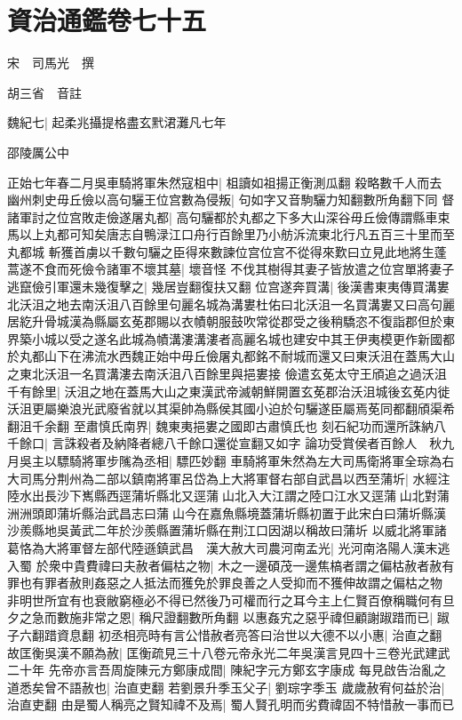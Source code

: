\chapter{資治通鑑卷七十五}
宋　司馬光　撰

胡三省　音註

魏紀七|{
	起柔兆攝提格盡玄黓涒灘凡七年}


邵陵厲公中

正始七年春二月吳車騎將軍朱然寇柤中|{
	柤讀如祖揚正衡測瓜翻}
殺略數千人而去　幽州刺史毋丘儉以高句驪王位宫數為侵叛|{
	句如字又音駒驪力知翻數所角翻下同}
督諸軍討之位宫敗走儉遂屠丸都|{
	高句驪都於丸都之下多大山深谷毋丘儉傳謂縣車束馬以上丸都可知矣唐志自鴨渌江口舟行百餘里乃小舫泝流東北行凡五百三十里而至丸都城}
斬獲首虜以千數句驪之臣得來數諫位宫位宫不從得來歎曰立見此地將生蓬蒿遂不食而死儉令諸軍不壞其墓|{
	壞音怪}
不伐其樹得其妻子皆放遣之位宫單將妻子逃竄儉引軍還未幾復擊之|{
	幾居豈翻復扶又翻}
位宫遂奔買溝|{
	後漢書東夷傳買溝婁北沃沮之地去南沃沮八百餘里句麗名城為溝婁杜佑曰北沃沮一名買溝婁又曰高句麗居紇升骨城漢為縣屬玄莬郡賜以衣幘朝服鼓吹常從郡受之後稍驕恣不復詣郡但於東界築小城以受之遂名此城為幘溝漊溝漊者高麗名城也建安中其王伊夷模更作新國都於丸都山下在沸流水西魏正始中毋丘儉屠丸都銘不耐城而還又曰東沃沮在蓋馬大山之東北沃沮一名買溝漊去南沃沮八百餘里與挹婁接}
儉遣玄莬太守王頎追之過沃沮千有餘里|{
	沃沮之地在蓋馬大山之東漢武帝滅朝鮮開置玄莬郡治沃沮城後玄莬内徙沃沮更屬樂浪光武廢省就以其渠帥為縣侯其國小迫於句驪遂臣屬焉莬同都翻頎渠希翻沮千余翻}
至肅慎氏南界|{
	魏東夷挹婁之國即古肅慎氏也}
刻石紀功而還所誅納八千餘口|{
	言誅殺者及納降者總八千餘口還從宣翻又如字}
論功受賞侯者百餘人　秋九月吳主以驃騎將軍步隲為丞相|{
	驃匹妙翻}
車騎將軍朱然為左大司馬衛將軍全琮為右大司馬分荆州為二部以鎮南將軍呂岱為上大將軍督右部自武昌以西至蒲圻|{
	水經注陸水出長沙下嶲縣西逕蒲圻縣北又逕蒲山北入大江謂之陸口江水又逕蒲山北對蒲洲洲頭即蒲圻縣治武昌志曰蒲山今在嘉魚縣境蓋蒲圻縣初置于此宋白曰蒲圻縣漢沙羨縣地吳黃武二年於沙羨縣置蒲圻縣在荆江口因湖以稱故曰蒲圻}
以威北將軍諸葛恪為大將軍督左部代陸遜鎮武昌　漢大赦大司農河南孟光|{
	光河南洛陽人漢末逃入蜀}
於衆中貴費禕曰夫赦者偏枯之物|{
	木之一邊碩茂一邊焦槁者謂之偏枯赦者赦有罪也有罪者赦則姦惡之人抵法而獲免於罪良善之人受抑而不獲伸故謂之偏枯之物}
非明世所宜有也衰敝窮極必不得已然後乃可權而行之耳今主上仁賢百僚稱職何有旦夕之急而數施非常之恩|{
	稱尺證翻數所角翻}
以惠姦宄之惡乎禕但顧謝踧踖而已|{
	踧子六翻踖資息翻}
初丞相亮時有言公惜赦者亮答曰治世以大德不以小惠|{
	治直之翻}
故匡衡吳漢不願為赦|{
	匡衡疏見三十八卷元帝永光二年吳漢言見四十三卷光武建武二十年}
先帝亦言吾周旋陳元方鄭康成間|{
	陳紀字元方鄭玄字康成}
每見啟告治亂之道悉矣曾不語赦也|{
	治直吏翻}
若劉景升季玉父子|{
	劉琮字季玉}
歲歲赦宥何益於治|{
	治直吏翻}
由是蜀人稱亮之賢知禕不及焉|{
	蜀人賢孔明而劣費禕固不特惜赦一事而已}


